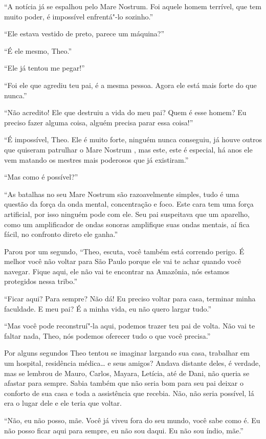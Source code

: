 ``A notícia já se espalhou pelo Mare Nostrum. Foi aquele homem terrível,
que tem muito poder, é impossível enfrentá"-lo sozinho.''

``Ele estava vestido de preto, parece um máquina?''

``É ele mesmo, Theo.''

``Ele já tentou me pegar!''

``Foi ele que agrediu teu pai, é a mesma pessoa. Agora ele está mais
forte do que nunca.''

``Não acredito! Ele que destruiu a vida do meu pai? Quem é esse homem?
Eu preciso fazer alguma coisa, alguém precisa parar essa coisa!''

``É impossível, Theo. Ele é muito forte, ninguém nunca conseguiu, já
houve outros que quiseram patrulhar o Mare Nostrum , mas este, este é
especial, há anos ele vem matando os mestres mais poderosos que já
existiram.''

``Mas como é possível?''

``As batalhas no seu Mare Nostrum são razoavelmente simples, tudo é uma
questão da força da onda mental, concentração e foco. Este cara tem uma
força artificial, por isso ninguém pode com ele. Seu pai suspeitava que
um aparelho, como um amplificador de ondas sonoras amplifique suas ondas
mentais, aí fica fácil, no confronto direto ele ganha.''

Parou por um segundo, ``Theo, escuta, você também está correndo perigo. É
melhor você não voltar para São Paulo porque ele vai te achar quando
você navegar. Fique aqui, ele não vai te encontrar na Amazônia, nós
estamos protegidos nessa tribo.''

``Ficar aqui? Para sempre? Não dá! Eu preciso voltar para casa, terminar
minha faculdade. E meu pai? É a minha vida, eu não quero largar tudo.''

``Mas você pode reconstruí"-la aqui, podemos trazer teu pai de volta. Não
vai te faltar nada, Theo, nós podemos oferecer tudo o que você
precisa.''

Por alguns segundos Theo tentou se imaginar largando sua casa, trabalhar
em um hospital, residência médica\ldots{} e seus amigos? Andava distante
deles, é verdade, mas se lembrou de Mauro, Carlos, Mayara, Letícia, até
de Dani, não queria se afastar para sempre. Sabia também que não seria
bom para seu pai deixar o conforto de sua casa e toda a assistência que
recebia. Não, não seria possível, lá era o lugar dele e ele teria que
voltar.

``Não, eu não posso, mãe. Você já viveu fora do seu mundo, você sabe
como é. Eu não posso ficar aqui para sempre, eu não sou daqui. Eu não
sou índio, mãe.''

